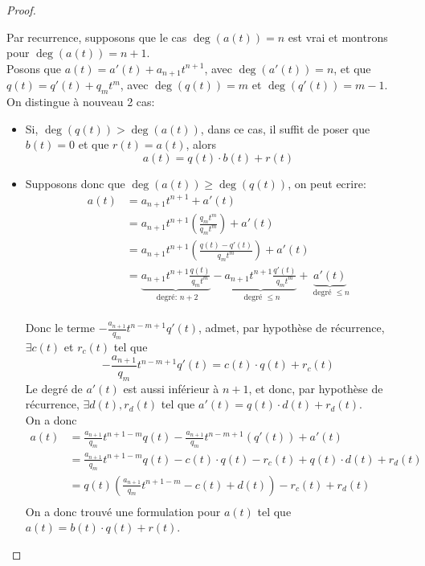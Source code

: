 \documentclass[11pt, a4paper, twoside]{article}
\begin{document}
\begin{proof}
\begin{itemize}
\end{itemize}
Par recurrence, supposons que le cas $\deg(a(t))=n$ est vrai et montrons pour $\deg(a(t))=n+1$.\\
Posons que $a(t)=a'(t) + a_{n+1} t^{n+1}$, avec $\deg(a'(t))=n$, et que $q(t) = q'(t) + q_m t^{m}$, avec $\deg(q(t)) = m$ et $\deg(q'(t))= m-1$.\\
On distingue à nouveau 2 cas:
\begin{itemize}
	\item Si, $\deg(q(t)) > \deg(a(t))$, dans ce cas, il suffit de poser que $b(t) = 0$ et que $r(t)= a(t)$, alors
		\[ 
			a(t) = q(t) \cdot b(t) + r(t)
		\]
	\item Supposons donc que $\deg(a(t)) \geq \deg(q(t))$, on peut ecrire:
		\begin{align*}
			a(t) &= a_{n+1} t^{n+1} + a'(t)\\
			     &= a_{n+1} t^{n+1} \left( \frac{q_m t^{m}}{q_{m} t^{m}}\right) + a'(t)\\
			     &= a_{n+1} t^{n+1} \left( \frac{q(t) - q'(t)}{q_{m} t^{m}}\right) + a'(t)\\
			     &= \underbrace{a_{n+1} t^{n+1} \frac{q(t)}{q_m t^{m}}}_{ \text{ degré: } n+2}
			     - \underbrace{a_{n+1} t^{n+1} \frac{q'(t)}{q_m t^{m}}}_{ \text{ degré  } \leq n } + \underbrace{a'(t)}_{ \text{ degré } \leq n}\\
		\end{align*}
		
Donc le terme  $-\frac{a_{n+1}}{q_m} t^{n-m+1} q'(t)$, admet, par hypothèse de récurrence, $\exists c(t)$ et $r_c(t)$ tel que
\[ 
	-\frac{a_{n+1}}{q_m} t^{n-m+1} q'(t) = c(t) \cdot q(t) + r_c(t)
\]
Le degré de $a'(t)$ est aussi inférieur à $n+1$, et donc, par hypothèse de récurrence, $\exists d(t) , r_d(t)$ tel que $a'(t)= q(t)\cdot d(t) + r_d(t)$.\\
On a donc
\begin{align*}
	a(t) &= \frac{a_{n+1}}{q_m} t^{n+1-m} q(t) - \frac{a_{n+1}}{q_m} t^{n-m+1} ( q'(t)) + a'(t)\\
	     &= \frac{a_{n+1}}{q_m} t^{n+1-m} q(t) - c(t) \cdot q(t) - r_c(t) + q(t) \cdot d(t) + r_d(t)\\
	     &= q(t) \left( \frac{a_{n+1}}{q_m} t^{n+1-m} - c(t) + d(t) \right) - r_c(t) + r_d(t) \\
\end{align*}
On a donc trouvé une formulation pour $a(t)$ tel que $a(t)=b(t) \cdot q(t) + r(t)$.
\end{itemize}
\end{proof}
\end{document}
